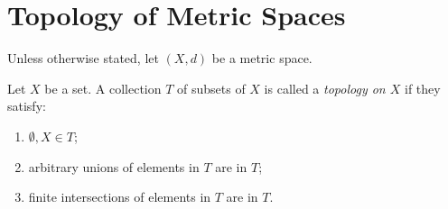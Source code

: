 \section{Topology of Metric Spaces}
    Unless otherwise stated, let $(X,d)$ be a metric space.
    \begin{definition}
        Let $X$ be a set. A collection $T$ of subsets of $X$ is called a \textit{topology on $X$} if they satisfy:
            \begin{enumerate}[label = (\arabic*),itemsep=1pt,topsep=3pt]
                \item $\emptyset,X \in T$;
                \item arbitrary unions of elements in $T$ are in $T$;
                \item finite intersections of elements in $T$ are in $T$.
            \end{enumerate}
    \end{definition}

